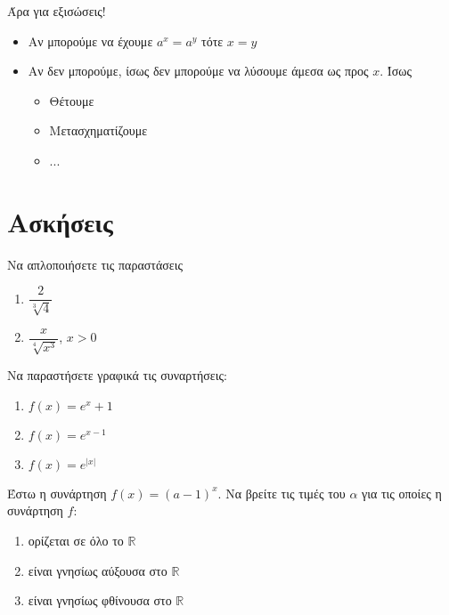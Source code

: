 \documentclass[greek]{beamer}
\begin{document}
\begin{frame}{Άρα για εξισώσεις!}
  \begin{itemize}
    \item<1-> Αν μπορούμε να έχουμε $a^x=a^y$ τότε $x=y$
    \item<2-> Αν δεν μπορούμε, ίσως δεν μπορούμε να λύσουμε άμεσα ως προς $x$. Ίσως
          \begin{itemize}
            \item<3-> Θέτουμε
            \item<4-> Μετασχηματίζουμε
            \item<4-> ...
          \end{itemize}
  \end{itemize}
\end{frame}

\section{Ασκήσεις}
\begin{askisi}
  Να απλοποιήσετε τις παραστάσεις
  \begin{enumerate}
    \item<1-> $\dfrac{2}{\sqrt[3]{4}}$
    \item<2-> $\dfrac{x}{\sqrt[4]{x^3}}$, $x>0$
  \end{enumerate}


\end{askisi}

\begin{askisi}
  Να παραστήσετε γραφικά τις συναρτήσεις:
  \begin{enumerate}
    \item<1-> $f(x)=e^x+1$
    \item<2-> $f(x)=e^{x-1}$
    \item<3-> $f(x)=e^{|x|}$
  \end{enumerate}


\end{askisi}

\begin{askisi}
  Έστω η συνάρτηση $f(x)=(a-1)^x$. Να βρείτε τις τιμές του $α$ για τις οποίες η συνάρτηση $f$:
  \begin{enumerate}
    \item<1-> ορίζεται σε όλο το $\mathbb{R}$
    \item<2-> είναι γνησίως αύξουσα στο $\mathbb{R}$
    \item<3-> είναι γνησίως φθίνουσα στο $\mathbb{R}$
  \end{enumerate}


\end{askisi}
\end{document}
